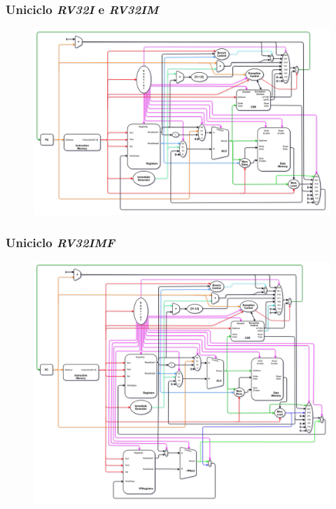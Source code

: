 \documentclass[aspectratio=169]{beamer}
\begin{document}
    \begin{frame}
        \frametitle{Uniciclo \textit{RV32I} e \textit{RV32IM}}
        \vfill
        \begin{figure}[H]
        \centering
            \includegraphics[width=.9\textwidth,height=.85\textheight,keepaspectratio]
            {../images/uarch_diagrams/singlecycle-RV32I-RV32IM.png}
        \end{figure}
        \vfill
    \end{frame}

    \begin{frame}
        \frametitle{Uniciclo \textit{RV32IMF}}
        \vfill
        \begin{figure}[H]
        \centering
            \includegraphics[width=.9\textwidth,height=.85\textheight,keepaspectratio]
            {../images/uarch_diagrams/singlecycle-RV32IMF.png}
        \end{figure}
        \vfill
    \end{frame}
\end{document}
